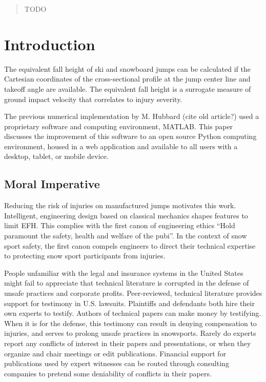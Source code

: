 \documentclass{article}
\begin{document}
\begin{abstract}
    TODO
\end{abstract}

\section{Introduction}
%
The equivalent fall height of ski and snowboard jumps can be calculated if the
Cartesian coordinates of the cross-sectional profile at the jump center line
and takeoff angle are available. The equivalent fall height is a surrogate
measure of ground impact velocity that correlates to injury severity.

The previous numerical implementation by M. Hubbard (cite old article?) used a
proprietary software and computing environment, MATLAB. This paper discusses
the improvement of this software to an open source Python computing
environment, housed in a web application and available to all users with a
desktop, tablet, or mobile device.

\subsection{Moral Imperative}
%
Reducing the risk of injuries on manufactured jumps motivates this work.
Intelligent, engineering design based on classical mechanics shapes features to
limit EFH. This complies with the first canon of engineering ethics ``Hold
paramount the safety, health and welfare of the pubi''. In the context of snow
sport safety, the first canon compels engineers to direct their technical
expertise to protecting snow sport participants from injuries.

People unfamiliar with the legal and insurance systems in the United States
might fail to appreciate that technical literature is corrupted in the defense
of unsafe practices and corporate profits. Peer-reviewed, technical literature
provides support for testimony in U.S. lawsuits. Plaintiffs and defendants both
hire their own experts to testify. Authors of technical papers can make money
by testifying. When it is for the defense, this testimony can result in denying
compensation to injuries, and serves to prolong unsafe practices in snowsports.
Rarely do experts report any conflicts of interest in their papers and
presentations, or when they organize and chair meetings or edit publications.
Financial support for publications used by expert witnesses can be routed
through consulting companies to pretend some deniability of conflicts in their
papers.
\end{document}
